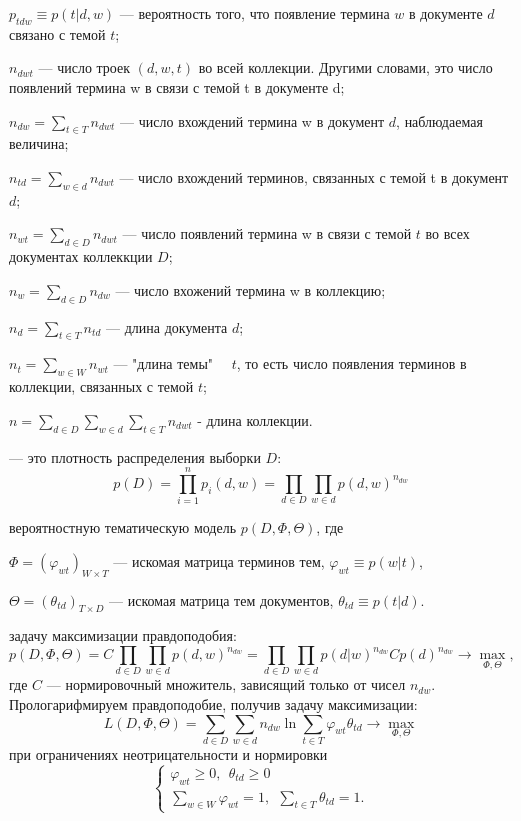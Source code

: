 \documentclass[12pt]{article}
\renewcommand{\geq}{\geqslant}
\renewcommand{\phi}{\varphi}
\begin{document}
$p_{tdw} \equiv p(t|d,w)$ --- вероятность того, что появление термина $w$ в документе $d$ связано с темой $t$;

$n_{dwt}$ --- число троек $(d,w,t)$ во всей коллекции. Другими словами, это число появлений термина w в связи с темой t в документе d;

$n_{dw} = \sum_{t \in T} n_{dwt}$ --- число вхождений термина w в документ $d$,  наблюдаемая величина;

$n_{td} = \sum_{w \in d} n_{dwt}$ --- число вхождений  терминов, связанных с темой t в документ $d$;

$n_{wt} = \sum_{d \in D} n_{dwt}$ --- число появлений термина w в связи с темой $t$ во всех документах коллеккции $D$;

$n_{w} = \sum_{d \in D} n_{dw}$ --- число вхожений термина w в коллекцию;

$n_{d} = \sum_{t \in T} n_{td}$ --- длина документа $d$;

$n_{t} = \sum_{w \in W} n_{wt}$ --- "длина темы" \ \ $t$, то есть число появления терминов в коллекции, связанных с темой $t$;

$n = \sum_{d \in D}\sum_{w \in d}\sum_{t \in T} n_{dwt}$ - длина коллекции.

 ---  это плотность распределения выборки $D$:
\[
p(D)=\prod^n_{i=1}p_i(d,w)=\prod_{d \in D}\prod_{w \in d}p(d,w)^{n_{dw}}
\]

 вероятностную тематическую модель $p(D,\Phi,\Theta)$, где 

$\Phi=(\phi_{wt})_{W \times T}$ --- искомая матрица терминов тем, $\phi_{wt} \equiv p(w|t)$,

$\Theta=(\theta_{td})_{T \times D}$ --- искомая матрица тем документов, $\theta_{td}\equiv p(t|d)$.

 задачу максимизации правдоподобия:
\[
p(D,\Phi,\Theta)=C\prod_{d \in D}\prod_{w \in d}p(d,w)^{n_{dw}}=\prod_{d \in D}\prod_{w \in d}p(d|w)^{n_{dw}}Cp(d)^{n_{dw}} \to \max_{\Phi,\Theta},
\]
где $C$ --- нормировочный множитель, зависящий только от чисел $n_{dw}$. Прологарифмируем правдоподобие, получив задачу максимизации:
\[
L(D,\Phi,\Theta)=\sum_{d \in D}\sum_{w \in d}n_{dw}\ln\sum_{t \in T}\phi_{wt}\theta_{td} \to \max_{\Phi,\Theta}
\]
при ограничениях неотрицательности и нормировки
\[
\left\{
	\begin{aligned}
		\phi_{wt} \geq 0,~~\theta_{td} \geq 0\\
		\sum_{w \in W} \phi_{wt} = 1,~~\sum_{t \in T} \theta_{td}  = 1.
	\end{aligned}
\right.
\]
\end{document}
